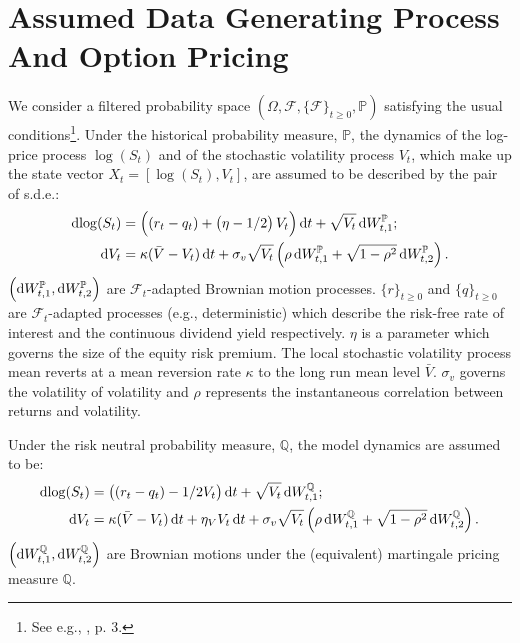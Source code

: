 \documentclass[11pt,a4paper,notitlepage]{article}
\numberwithin{equation}{section}
\begin{document}
\newpage
 
\section{Assumed Data Generating Process And Option Pricing}
We consider a filtered probability space $\left(\Omega, \mathcal{F}, \lbrace\mathcal{F}\rbrace_{t\geq0}, \mathbb{P} \right)$ satisfying the usual conditions\footnote{See e.g., \citet{protterstochastic}, p. 3.}. Under the historical probability measure, $\mathbb{P}$, the dynamics of the log-price process $\log(S_t)$ and of the stochastic volatility process $V_t$, which make up the state vector $X_t = [\log(S_t), V_t]$, are assumed to be described by the pair of s.d.e.:
\begin{align}
	\dif{\log(S_t)} &= \left((r_t-q_t)+ \left(\eta-1/2\right) V_t \right)\dif t + \sqrt{V_t} \dif W_{t,1}^\mathbb{P}; \label{PHestonS}\\
	\dif{V_t} &= \kappa(\bar{V}-V_t)\dif t + \sigma_v\sqrt{V_t}\left(\rho \dif W_{t,1}^\mathbb{P} + \sqrt{1-\rho^2}\dif W_{t,2}^\mathbb{P}\right). \label{PHestonV}
\end{align}
$\left(\dif W_{t,1}^\mathbb{P}, \dif W_{t,2}^\mathbb{P}\right)$ are $\mathcal{F}_t$-adapted Brownian motion processes. $\lbrace r \rbrace_{t\geq 0}$  and  $\lbrace q \rbrace_{t\geq 0}$ are $\mathcal{F}_t$-adapted processes (e.g., deterministic) which describe the risk-free rate of interest and the continuous dividend yield respectively. $\eta$ is a parameter which governs the size of the equity risk premium. The local stochastic volatility process mean reverts at a mean reversion rate $\kappa$ to the long run mean level $\bar{V}$. $\sigma_v$ governs the volatility of volatility and $\rho$ represents the instantaneous correlation between returns and volatility.

Under the risk neutral probability measure, $\mathbb{Q}$, the model dynamics are assumed to be: 
\begin{align}
	\dif{\log(S_t)} &= \left( (r_t-q_t) - 1/2 V_t\right) \dif t + \sqrt{V_t} \dif W_{t,1}^\mathbb{Q};\label{QHestonS}\\
	\dif{V_t} &= \kappa(\bar{V}-V_t)\dif t + \eta_{V}V_t\dif t + \sigma_v\sqrt{V_t}\left(\rho \dif W_{t,1}^\mathbb{Q} + \sqrt{1-\rho^2}\dif W_{t,2}^\mathbb{Q}\right).\label{QHestonV}
\end{align}
$\left(\dif W_{t,1}^\mathbb{Q}, \dif W_{t,2}^\mathbb{Q}\right)$ are Brownian motions under the (equivalent) martingale pricing measure $\mathbb{Q}$.
\end{document}
